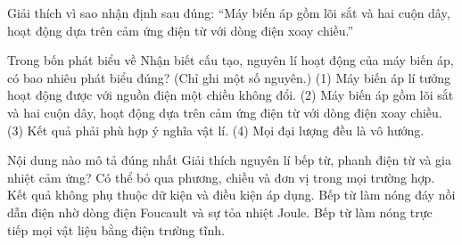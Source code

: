 \begin{bt}
Giải thích vì sao nhận định sau đúng: “Máy biến áp gồm lõi sắt và hai cuộn dây, hoạt động dựa trên cảm ứng điện từ với dòng điện xoay chiều.”
\end{bt}

\begin{ex}
Trong bốn phát biểu về Nhận biết cấu tạo, nguyên lí hoạt động của máy biến áp, có bao nhiêu phát biểu đúng? (Chỉ ghi một số nguyên.) (1) Máy biến áp lí tưởng hoạt động được với nguồn điện một chiều không đổi. (2) Máy biến áp gồm lõi sắt và hai cuộn dây, hoạt động dựa trên cảm ứng điện từ với dòng điện xoay chiều. (3) Kết quả phải phù hợp ý nghĩa vật lí. (4) Mọi đại lượng đều là vô hướng.
\end{ex}

\begin{ex}
Nội dung nào mô tả đúng nhất Giải thích nguyên lí bếp từ, phanh điện từ và gia nhiệt cảm ứng?
\choice
{Có thể bỏ qua phương, chiều và đơn vị trong mọi trường hợp.}
{Kết quả không phụ thuộc dữ kiện và điều kiện áp dụng.}
{\True Bếp từ làm nóng đáy nồi dẫn điện nhờ dòng điện Foucault và sự tỏa nhiệt Joule.}
{Bếp từ làm nóng trực tiếp mọi vật liệu bằng điện trường tĩnh.}
\end{ex}

